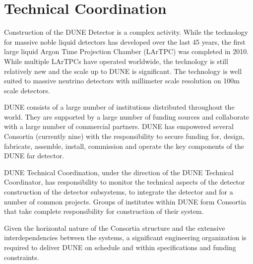 \chapter{Technical Coordination}
\label{ch:fdsp-coord}

Construction of the DUNE Detector is a complex activity. While the
technology for massive noble liquid detectors has developed over the
last 45 years, the first large liquid Argon Time Projection Chamber
(LArTPC) was completed in 2010. While multiple LArTPCs have operated
worldwide, the technology is still relatively new and the scale up to
DUNE is significant. The technology is well suited to massive neutrino
detectors with millimeter scale resolution on 100m scale detectors.

DUNE consists of a large number of institutions distributed throughout
the world. They are supported by a large number of funding sources and
collaborate with a large number of commercial partners. DUNE has
empowered several Consortia (currently nine) with the responsibility
to secure funding for, design, fabricate, assemble, install,
commission and operate the key components of the DUNE far detector.

DUNE Technical Coordination, under the direction of the DUNE Technical
Coordinator, has responsibility to monitor the technical aspects of
the detector construction of the detector subsystems, to integrate the
detector and for a number of common projects. Groups of institutes
within DUNE form Consortia that take complete responsibility for
construction of their system.

Given the horizontal nature of the Consortia structure and the
extensive interdependencies between the systems, a significant
engineering organization is required to deliver DUNE on schedule and
within specifications and funding constraints.

